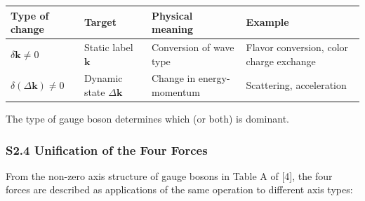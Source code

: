 \documentclass[
  a4paper,11pt]{article}
\newcounter{none}
\theoremstyle{definition}
\theoremstyle{remark}
\begin{document}
{\def\LTcaptype{none} %
\begin{longtable}[]{@{}
  >{\raggedright\arraybackslash}p{}
  >{\raggedright\arraybackslash}p{}
  >{\raggedright\arraybackslash}p{}
  >{\raggedright\arraybackslash}p{}@{}}
\toprule\noalign{}
\begin{minipage}[b]{\linewidth}\raggedright
Type of change
\end{minipage} & \begin{minipage}[b]{\linewidth}\raggedright
Target
\end{minipage} & \begin{minipage}[b]{\linewidth}\raggedright
Physical meaning
\end{minipage} & \begin{minipage}[b]{\linewidth}\raggedright
Example
\end{minipage} \\
\midrule\noalign{}
\endhead
\bottomrule\noalign{}
\endlastfoot
\(\delta\mathbf{k} \neq 0\) & Static label \(\mathbf{k}\) & Conversion
of wave type & Flavor conversion, color charge exchange \\
\(\delta(\Delta\mathbf{k}) \neq 0\) & Dynamic state \(\Delta\mathbf{k}\)
& Change in energy-momentum & Scattering, acceleration \\
\end{longtable}
}

The type of gauge boson determines which (or both) is dominant.

\subsubsection{S2.4 Unification of the Four
Forces}\label{s2.4-unification-of-the-four-forces}

From the non-zero axis structure of gauge bosons in Table A of {[}4{]},
the four forces are described as applications of the same operation to
different axis types:
\end{document}
